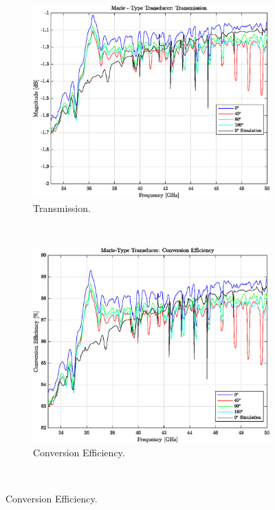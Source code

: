 \documentclass[english,twoside]{article}
\begin{document}
	\begin{figure}
		\centering			
		\begin{subfigure}[b]{0.48\textwidth}
			\includegraphics[width=\textwidth]{figures/marie_measured_transmission}
			\caption{Transmission.}
		\end{subfigure}	
		~
		\begin{subfigure}[b]{0.48\textwidth}
			\includegraphics[width=\textwidth]{figures/marie_measured_eff}
			\caption{Conversion Efficiency.}
		\end{subfigure}
		\vspace{10pt}\\		

\end{figure}
\end{document}
